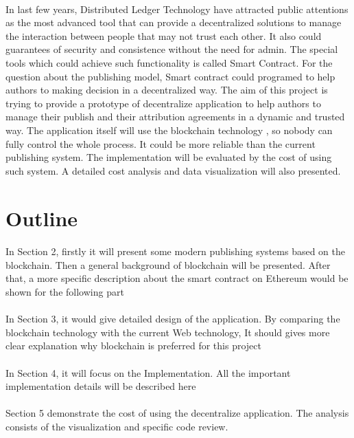 \documentclass [12pt]{report}
\begin{document}
\paragraph{}In last few years, Distributed Ledger Technology have attracted public attentions as 
the most advanced tool that can provide a decentralized solutions to manage the interaction 
between people that may not trust each other. 
It also could guarantees of security and consistence without the need for admin. 
The special tools which could achieve such functionality is called Smart Contract. For the question about the publishing model,
Smart contract could programed to help authors to making decision in a decentralized way. The aim of this project is trying to provide a prototype of decentralize application 
to help authors to manage their publish and their attribution agreements in a dynamic and trusted way. 
The application itself will use the blockchain technology \cite{buterin2013ethereum}, so nobody can fully control the whole process.
It could be more reliable than the current publishing system. 
The implementation will be evaluated by the cost of using such system. 
A detailed cost analysis and data visualization will also presented.  
\section{Outline}
\paragraph{}In Section 2, firstly it will present some modern publishing systems based on the blockchain.  
Then a general background of blockchain will be presented. After that, 
a more specific description about the smart contract on Ethereum would be shown for the following part
\paragraph{}In Section 3, it would give detailed design of the application. 
By comparing the blockchain technology with the current Web technology, 
It should gives more clear explanation why blockchain is preferred for this project
\paragraph{}In Section 4, it will focus on the Implementation. 
All the important implementation details will be described here
\paragraph{}Section 5 demonstrate the cost of using the decentralize application. 
The analysis consists of the visualization and specific code review.
\end{document}
